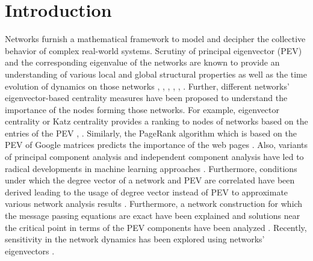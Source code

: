 \documentclass[envcountreset,oribibl]{llncs}
\begin{document}
\section{Introduction}
Networks furnish a mathematical framework to model and decipher the collective behavior of complex real-world systems. Scrutiny of principal eigenvector (PEV) and the corresponding eigenvalue of the networks are known to provide an understanding of various local and global structural properties as well as the time evolution of dynamics on those networks 
\cite{pevec_nat_phys_2013}, \cite{castellano_localization_2017},  \cite{evec_localization_2017}, \cite{evec_localization_2020}, \cite{evec_loc_jaccard_2021}, \cite{neurons_localization_2014}. Further, different networks' eigenvector-based centrality measures have been proposed to understand the importance of the nodes forming those networks. For example, eigenvector centrality or Katz centrality provides a ranking to nodes of networks based on the entries of the PEV \cite{evec_loc_temporal_network_2017}, \cite{newman_book_2010}. Similarly, the PageRank algorithm which is based on the PEV of Google matrices predicts the importance of the web pages \cite{newman_book_2010}. Also, variants of principal component analysis and independent component analysis have led to radical developments in machine learning approaches \cite{machine_learning_2009}. Furthermore, conditions under which the degree vector of a network and PEV are correlated have been derived leading to the usage of degree vector instead of PEV to approximate various network analysis results \cite{deg_pev_corr_2012}. Furthermore, a network construction for which the message passing equations are exact have been explained and solutions near the critical point in terms of the PEV components have been analyzed \cite{message_passing_2017}. Recently, sensitivity in the network dynamics has been explored using networks' eigenvectors \cite{sensitivity_dynamics_2017}.
% 
\end{document}
